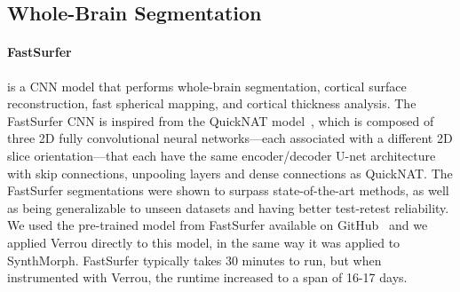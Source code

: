 
\subsection{Whole-Brain Segmentation}


\paragraph{FastSurfer}\cite{henschel2020fastsurfer} is a CNN model that performs whole-brain segmentation, cortical surface reconstruction, fast spherical mapping, and cortical thickness analysis. The FastSurfer CNN is inspired from the QuickNAT model~\cite{roy2019quicknat}, which is composed of three 2D fully convolutional neural networks---each associated with a different 2D slice orientation---that each have the same encoder/decoder U-net architecture with skip connections, unpooling layers and dense connections as QuickNAT.
The FastSurfer segmentations were shown to surpass state-of-the-art methods, as well as being generalizable to unseen datasets and having better test-retest reliability. We used the pre-trained model from FastSurfer available on GitHub~\cite{fastsurfer-github} and we applied Verrou directly to this model, in the same way it was applied to SynthMorph. 
FastSurfer typically takes 30 minutes to run, but when instrumented with Verrou, the runtime increased to a span of 16-17 days.

